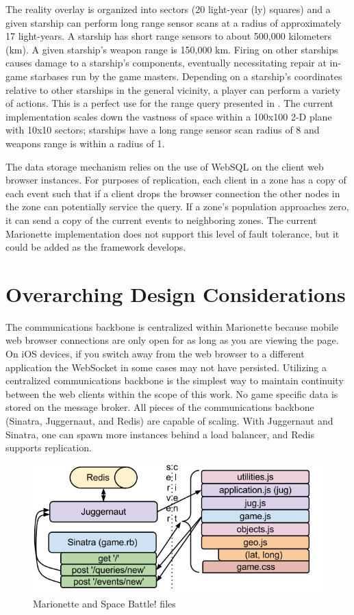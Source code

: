 \documentclass[12pt]{report}	%
\theoremstyle{definition}
\theoremstyle{remark}
\begin{document}
The reality overlay is organized into sectors (20 light-year (ly)
squares) and a given starship can perform long range sensor scans at a
radius of approximately 17 light-years. A starship has short range
sensors to about 500,000 kilometers (km). A given starship's weapon
range is 150,000 km. Firing on other starships causes damage to a starship's
components, eventually necessitating repair at in-game starbases run by
the game masters. Depending on a starship's coordinates relative to
other starships in the general vicinity, a player can perform a variety of
actions. This is a perfect use for the range query presented in
\cite{zio2011p2p}. The current implementation scales
down the vastness of space within a 100x100 2-D plane with 10x10
sectors; starships have a long range sensor scan radius of 8 and weapons
range is within a radius of 1.

The data storage mechanism relies on the use of WebSQL on the client web
browser instances. For purposes of replication, each client in a zone has
a copy of each event such that if a client drops the browser connection
the other nodes in the zone can potentially service the query. If a
zone's population approaches zero, it can send a copy of the current
events to neighboring zones. The current Marionette implementation does
not support this level of fault tolerance, but it could be added as the
framework develops.

\chapter{Overarching Design Considerations}

The communications backbone is centralized within Marionette because
mobile web browser connections are only open for as long as you are
viewing the page. On iOS devices, if you switch away from
the web browser to a different application the WebSocket in some cases
may not have persisted. Utilizing a centralized communications backbone
is the simplest way to maintain continuity between the web clients
within the scope of this work. No game specific data is stored on the
message broker. All pieces of the communications backbone (Sinatra,
Juggernaut, and Redis) are capable of scaling. With Juggernaut and
Sinatra, one can spawn more instances behind a load balancer, and Redis
supports replication.

\begin{figure}[h!]
\centering
\includegraphics[scale=0.6]{3.png}
\caption{Marionette and Space Battle! files}
\label{files}
\end{figure}
\end{document}
